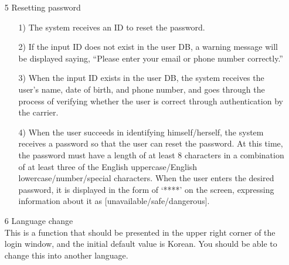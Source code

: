 \documentclass[conference]{IEEEtran}
\begin{document}
\begin{enumerate}
\item[5] Resetting password
\begin{itemize}
\item [1)]  The system receives an ID to reset the password.
\item [2)] If the input ID does not exist in the user DB, a warning message will be displayed saying, ``Please enter your email or phone number correctly.''
\item [3)] When the input ID exists in the user DB, the system receives the user's name, date of birth, and phone number, and goes through the process of verifying whether the user is correct through authentication by the carrier.
\item [4)] When the user succeeds in identifying himself/herself, the system receives a password so that the user can reset the password. At this time, the password must have a length of at least 8 characters in a combination of at least three of the English uppercase/English lowercase/number/special characters. When the user enters the desired password, it is displayed in the form of ‘****’ on the screen, expressing information about it as [unavailable/safe/dangerous].\\
\end{itemize}

\item[6] Language change\\
This is a function that should be presented in the upper right corner of the login window, and the initial default value is Korean. You should be able to change this into another language.
\end{enumerate}
\end{document}
